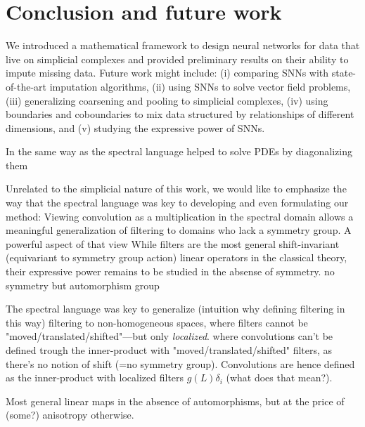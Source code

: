 \section{Conclusion and future work}

We introduced a mathematical framework to design neural networks for data that live on simplicial complexes and provided preliminary results on their ability to impute missing data.
Future work might include:
(i) comparing SNNs with state-of-the-art imputation algorithms,
(ii) using SNNs to solve vector field problems,
(iii) generalizing coarsening and pooling to simplicial complexes,
(iv) using boundaries and coboundaries to mix data structured by relationships of different dimensions,
and (v) studying the expressive power of SNNs.

In the same way as the spectral language helped to solve PDEs by diagonalizing them

Unrelated to the simplicial nature of this work, we would like to emphasize the way that the spectral language was key to developing and even formulating our method:
Viewing convolution as a multiplication in the spectral domain allows a meaningful generalization of filtering to domains who lack a symmetry group. %
A powerful aspect of that view
While filters are the most general shift-invariant (equivariant to symmetry group action) linear operators in the classical theory, their expressive power remains to be studied in the absense of symmetry.
no symmetry but automorphism group 

The spectral language was key to generalize (intuition why defining filtering in this way) filtering to non-homogeneous spaces, where filters cannot be "moved/translated/shifted"---but only \emph{localized}.
where convolutions can't be defined trough the inner-product with "moved/translated/shifted" filters, as there's no notion of shift (=no symmetry group).
Convolutions are hence defined as the inner-product with localized filters $g(L)\delta_i$ (what does that mean?).

Most general linear maps in the absence of automorphisms, but at the price of (some?) anisotropy otherwise.

